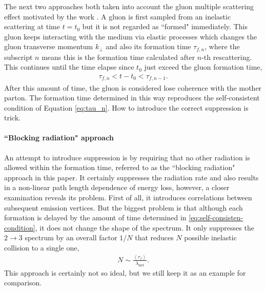 \documentclass[aps, prc, reprint, amsmath, groupedaddress, nofootinbib]{revtex4-1}
\begin{document}
The next two approaches both taken into account the gluon multiple scattering effect motivated by the work .
A gluon is first sampled from an inelastic scattering at time $t=t_0$ but it is not regarded as ``formed" immediately. 
This gluon keeps interacting with the medium via elastic processes which changes the gluon transverse momentum $k_\perp$ and also its formation time $\tau_{f,n}$, where the subscript $n$ means this is the formation time calculated after $n$-th rescattering.
This continues until the time elapse since $t_0$ just exceed the gluon formation time,
\begin{eqnarray}\label{eq:self-consisten-condition}
\tau_{f, n} < t-t_0 < \tau_{f, n-1}.
\end{eqnarray}
After this amount of time, the gluon is considered lose coherence with the mother parton.
The formation time determined in this way reproduces the self-consistent condition of Equation \ref{eq:tau_n}.
How to introduce the correct suppression is trick.

\paragraph*{``Blocking radiation" approach}
An attempt to introduce suppression is by requiring that no other radiation is allowed within the formation time, referred to as the ``blocking radiation" approach in this paper.
It certainly suppresses the radiation rate and also results in a non-linear path length dependence of energy loss, however, a closer examination reveals its problem.
First of all, it introduces correlations between subsequent emission vertices.
But the biggest problem is that although each formation is delayed by the amount of time determined in \ref{eq:self-consisten-condition},
it does not change the shape of the spectrum.
It only suppresses the $2\rightarrow 3$ spectrum by an overall factor $1/N$ that reduces $N$ possible inelastic collision to a single one,
\begin{eqnarray}
N \sim \frac{\left\langle\tau_f\right\rangle}{ \lambda_{\textrm{inel}}}.
\end{eqnarray}
This approach is certainly not so ideal, but we still keep it as an example for comparison.
\end{document}
